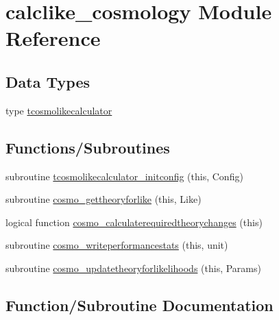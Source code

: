 \hypertarget{namespacecalclike__cosmology}{}\section{calclike\+\_\+cosmology Module Reference}
\label{namespacecalclike__cosmology}
\subsection*{Data Types}
\begin{DoxyCompactItemize}
\item 
type \mbox{\hyperlink{structcalclike__cosmology_1_1tcosmolikecalculator}{tcosmolikecalculator}}
\end{DoxyCompactItemize}
\subsection*{Functions/\+Subroutines}
\begin{DoxyCompactItemize}
\item 
subroutine \mbox{\hyperlink{namespacecalclike__cosmology_a86c0c49dcb09440792bc5a002f456f57}{tcosmolikecalculator\+\_\+initconfig}} (this, Config)
\item 
subroutine \mbox{\hyperlink{namespacecalclike__cosmology_a6f159ab28e06f381042c55c451a060a9}{cosmo\+\_\+gettheoryforlike}} (this, Like)
\item 
logical function \mbox{\hyperlink{namespacecalclike__cosmology_aa5acf9c357eef01f44553072f8327e5e}{cosmo\+\_\+calculaterequiredtheorychanges}} (this)
\item 
subroutine \mbox{\hyperlink{namespacecalclike__cosmology_a98c01c544a399527119cde828e456b4b}{cosmo\+\_\+writeperformancestats}} (this, unit)
\item 
subroutine \mbox{\hyperlink{namespacecalclike__cosmology_afcac4304981be0a09f45f15d9194e427}{cosmo\+\_\+updatetheoryforlikelihoods}} (this, Params)
\end{DoxyCompactItemize}


\subsection{Function/\+Subroutine Documentation}
\mbox{\label{namespacecalclike__cosmology_aa5acf9c357eef01f44553072f8327e5e}} 
